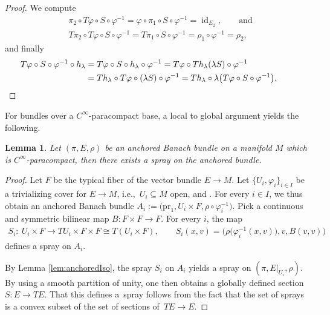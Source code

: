 \documentclass[11pt]{article}
\numberwithin{equation}{section}
\numberwithin{equation}{section}
\newtheorem{Lemma}[Theorem]{Lemma}
\DeclareMathOperator{\id}{id}
\begin{document}
\begin{proof}
 We compute
 \begin{align*}
 &\pi_{2} \circ T\varphi \circ S \circ \varphi^{-1}= \varphi \circ \pi_{1} \circ S \circ \varphi^{-1} = \id_{E_{2}}, \qquad\text{and}\\
 &T\pi_{2} \circ T\varphi \circ S \circ \varphi^{-1}= T\pi_{1} \circ S \circ \varphi^{-1} = \rho_{1} \circ \varphi^{-1} = \rho_{2},
 \end{align*}
 and finally
 \begin{align*}
 T\varphi \circ S \circ \varphi^{-1} \circ h_{\lambda} &{}= T\varphi \circ S \circ h_{\lambda} \circ \varphi^{-1} = T \varphi \circ Th_{\lambda} (\lambda S) \circ \varphi^{-1} \\
 &{}= Th_{\lambda} \circ T\varphi \circ (\lambda S) \circ \varphi^{-1} = Th_{\lambda} \circ \lambda\bigl(T\varphi \circ S \circ \varphi^{-1}\bigr). \qedhere
\tag*{\qed}
\end{align*}
\renewcommand{\qed}{}
\end{proof}

For bundles over a $C^\infty$-paracompact base, a local to global argument yields the following.

\begin{Lemma}\label{lem:ex_spray_anchor}
Let $(\pi,E,\rho)$ be an anchored Banach bundle on a manifold $M$ which is $C^\infty$-paracompact, then there exists a spray on the anchored bundle.
\end{Lemma}

\begin{proof}
 Let $F$ be the typical fiber of the vector bundle $E \rightarrow M$.
 Let $\{U_{i}, \varphi_{i}\}_{i\in I}$ be a trivializing cover for $E \rightarrow M$, i.e.,~$U_{i} \subseteq M$ open, and .
 For every $i\in I$, we thus obtain an anchored Banach bundle $A_{i} := \bigl(\mathrm{pr}_{1},U_{i} \times F, \rho \circ \varphi_{i}^{-1}\bigr)$.
 Pick a continuous and symmetric bilinear map $B\colon F \times F \rightarrow F$.
 For every $i$, the map
 \begin{align*}
 S_{i}\colon\ U_{i} \times F \rightarrow TU_{i} \times F \times F \cong T(U_{i} \times F), \qquad
 S_i(x,v) = \bigl(\rho \bigl(\varphi_{i}^{-1}(x,v)\bigr),v,B(v,v)\bigr)
 \end{align*}
 defines a spray on $A_{i}$.

 By Lemma \ref{lem:anchoredIso}, the spray $S_{i}$ on $A_{i}$ yields a spray on $(\pi, E|_{U_{i}},\rho)$.
 By using a smooth partition of unity, one then obtains a globally defined section $S\colon E \rightarrow TE$.
 That this defines a~spray follows from the fact that the set of sprays is a convex subset of the set of sections of~${TE \rightarrow E}$.
\end{proof}
\end{document}
